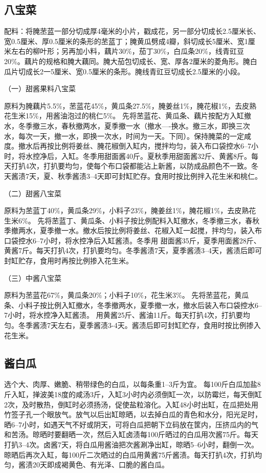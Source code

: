 \documentclass{ctexbook}
\begin{document}
\subsection{八宝菜}
配料：将腌苤蓝一部分切成厚4毫米的小片，戳成花，另一部分切成长2.5厘米长、宽0.5厘米、厚0.5厘米的条形的苤蓝丁；腌黄瓜劈成4瓣，斜切成长5厘米、宽1厘米左右的柳叶形；另再加小料，藕片30\%，茄丁30\%，白瓜条20\%，线青豇豆20\%。藕片的规格和腌大藕同。腌大茄包切成长、宽、厚各2厘米的菱角形。腌白瓜片切成长2一5厘米、宽0.5厘米的条形。腌线青豇豆切成长2.5厘米的小段。

（一）甜酱果料八宝菜

原料为腌藕片5.5\%，苤蓝花45\%，黄瓜条27.5\%，腌姜丝1\%，腌花椒1\%，去皮熟花生米15\%，用酱油泡过的桃仁5\%。
先将苤蓝花、黄瓜条、藕片按配方入缸撤水，冬季撤三水，春秋撤两水，夏季撤一水（撤水----换水。撤三水，即换三次水，每次一天，撤一水，即换一次水，时间为一天。下同）。保持腌菜的一定咸度。撤水后再按比例将姜丝、腌花椒倒入缸内，搅拌均匀，装入布口袋控水6--7小时，将水控净后，入缸。冬季用甜面酱40斤。夏秋季用甜面酱32斤、黄酱8斤。每天打扒4次，打扒要均匀，使每个布口袋都能沾上新酱，以防成品颜色不一致。冬天酱渍7天，夏、秋季酱渍3--4天即可封缸贮存。食用时按比例拌入花生米和桃仁。

（二）甜酱八宝菜

原料为苤蓝丁40\%，黄瓜条29\%，小料子23\%，腌姜丝1\%，腌花椒1\%，去皮熟花生米6\%。
先将苤蓝丁、黄瓜条、小料子按比例配料入缸撤水，冬季撤三水，春秋季撤两水，夏季撤一水。撤水后按比例将姜丝、花椒入缸一起搅，拌均匀，装入布口袋控水6--7小时，将水控净后入缸酱渍。冬季用
甜面酱35斤，夏季用面酱28斤、黄酱7斤。每天打扒4次，打扒要均匀。冬季酱渍7天，夏季酱渍3--4天，酱渍后即可封缸贮存，食用时再按比例掺入花生米。

（三）中酱八宝菜

原料为苤蓝花67\%，黄瓜条20\%；小料子10\%，花生米3\%。
先将苤蓝花，黄瓜条、小料子按比例入缸撤水，冬季撤两水，夏季撤一水，撤水后装入布口袋控水6--7小时，将水控净入缸酱渍。
用黄酱25斤、酱油11斤。每天打扒4次，打扒要均匀。冬季酱渍7天左右，夏季酱渍3-4天。酱渍后即可封缸贮存，食用时按比例掺入花生米。
\subsection{酱白瓜}
选个大、肉厚、嫩脆、稍带绿色的白瓜，以每条重1--3斤为宜。
每100斤白瓜加盐8斤入缸，掸波美18度的咸汤3斤，入缸3小时内必须倒缸一次，以防霉烂，每天倒缸2次，及时散热，倒缸时必须扬汤，促使盐粒溶化。入缸48小时出缸，在瓜把处用竹签子孔一个眼放气。放气以后出缸晾晒，以去掉白瓜的青色和水分，阳光足时，晒6--7小时，如遇天气不好或阴天，可将白瓜把朝下立码放在筐内，压挤瓜内的气和苦汤。晾晒时要翻晒一次，然后入缸卤渍每100斤晒过的白瓜用次酱75斤。每天打扒3--4次。卤酱7天，将白瓜用酱油把次酱涮净出缸，晾晒5--6小时，翻倒一次。晾晒后再次入缸，每100斤二次晒过的白瓜用黄酱75斤酱渍。每天打扒4次，打扒均匀，酱渍20天即成褐黄色、有光泽、口脆的酱白瓜。
\end{document}
